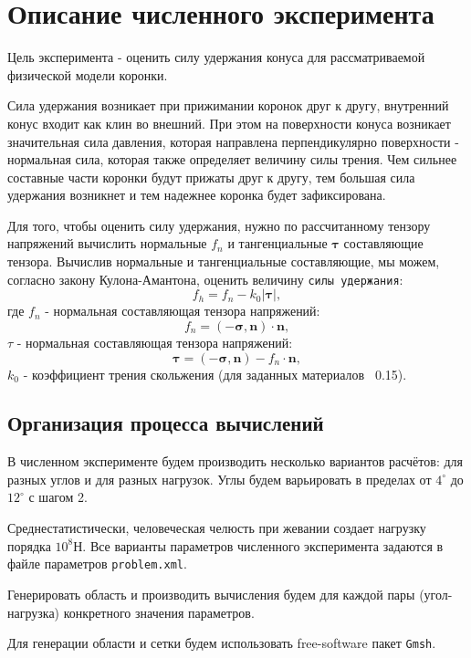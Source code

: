 \documentclass[a4paper, 14pt]{extreport}
\begin{document}
\section{Описание численного эксперимента}

Цель эксперимента - оценить силу удержания конуса для рассматриваемой физической модели коронки.

Сила удержания возникает при прижимании коронок друг
к другу, внутренний конус входит как клин во внешний.  
При этом на поверхности конуса возникает значительная сила 
давления, которая направлена перпендикулярно поверхности - 
нормальная сила, которая также определяет величину силы 
трения. Чем сильнее составные части коронки будут прижаты 
друг к другу, тем большая сила удержания возникнет и тем 
надежнее коронка будет зафиксирована.

Для того, чтобы оценить силу удержания, нужно по 
рассчитанному тензору напряжений
вычислить нормальные $f_n$ и тангенциальные 
$\boldsymbol{\tau}$ составляющие тензора. 
Вычислив нормальные и тангенциальные составляющие, мы 
можем, согласно закону Кулона-Амантона, оценить величину 
\texttt{силы удержания}:
\begin{equation}
	\label{eq: ka}
	f_{h} = f_n - k_0 |\boldsymbol{\tau}|,
\end{equation}
где $f_n$ - нормальная составляющая тензора напряжений:
$$f_n = (-\boldsymbol{\sigma}, \boldsymbol{n}) \cdot \boldsymbol{n},$$
$\tau$ - нормальная составляющая тензора напряжений:
$$\boldsymbol{\tau} = (-\boldsymbol{\sigma}, \boldsymbol{n}) - f_n \cdot \boldsymbol{n},$$
$k_0$ - коэффициент трения скольжения (для заданных материалов ~0.15).

\subsection{Организация процесса вычислений}

В численном эксперименте будем производить несколько 
вариантов расчётов: для разных углов и для разных нагрузок. 
Углы будем варьировать в пределах от 
$4^{\circ}$ до $12^{\circ}$  с 
шагом 2. 

Среднестатистически, человеческая челюсть при жевании 
создает нагрузку порядка $10^8$Н. 
Все варианты параметров численного эксперимента задаются в 
файле параметров \texttt{problem.xml}.

Генерировать область  и производить вычисления будем для 
каждой пары (угол-нагрузка) конкретного значения параметров.

Для генерации области и сетки будем использовать 
free-software пакет \texttt{Gmsh}.
\end{document}
